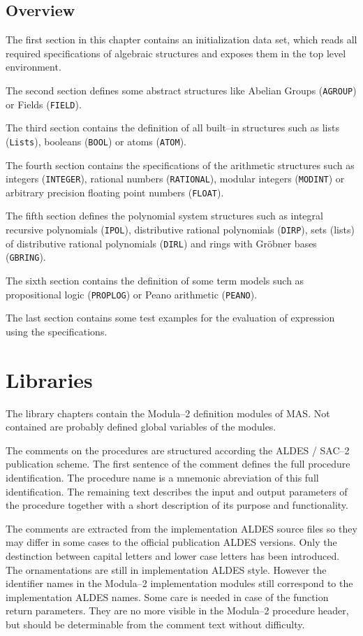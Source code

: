 \subsection{Overview}

The first section in this chapter contains  
an initialization data set, which reads all 
required specifications of algebraic structures 
and exposes them in the top level environment.

The second section defines some abstract structures
like Abelian Groups (\verb/AGROUP/) 
or Fields (\verb/FIELD/).

The third section contains the 
definition of all built--in structures 
such as lists (\verb/Lists/), 
booleans (\verb/BOOL/)
or atoms (\verb/ATOM/).

The fourth section contains the specifications 
of the arithmetic structures 
such as integers (\verb/INTEGER/), rational numbers (\verb/RATIONAL/), 
modular integers (\verb/MODINT/) 
or arbitrary precision floating point numbers (\verb/FLOAT/).

The fifth section defines the polynomial system 
structures 
such as integral recursive polynomials (\verb/IPOL/),
distributive rational polynomials (\verb/DIRP/),
sets (lists) of distributive rational polynomials (\verb/DIRL/) 
and rings with Gr\"obner bases (\verb/GBRING/).

The sixth section contains the definition of 
some term models such as 
propositional logic (\verb/PROPLOG/) or
Peano arithmetic (\verb/PEANO/).

The last section contains some test examples for 
the evaluation of expression using the specifications.


\section{Libraries}

The library chapters contain the 
Modula--2 definition modules of MAS.
Not contained are probably defined global variables 
of the modules.

The comments on the procedures are 
structured according the ALDES / SAC--2 
publication scheme. The first sentence of the 
comment defines the full procedure identification. 
The procedure name is a mnemonic abreviation of this 
full identification.
The remaining text describes the 
input and output parameters of the procedure 
together with a short description of 
its purpose and functionality.

The comments are extracted from the 
implementation ALDES source files so they may 
differ in some cases to the official 
publication ALDES versions. Only the 
destinction between capital letters and lower case letters 
has been introduced. 
The ornamentations are still in implementation ALDES style.
However the identifier names in the Modula--2 implementation 
modules still correspond to the implementation ALDES names.
Some care is needed in case of the function return 
parameters. They are no more visible in the 
Modula--2 procedure header, but should be 
determinable from the comment text without difficulty.

